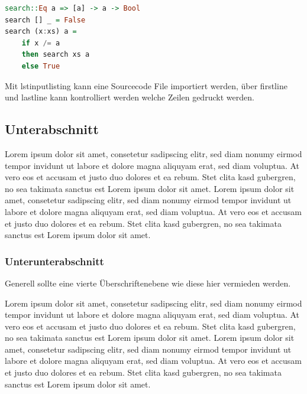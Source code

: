 \lstset{language=Haskell}
\begin{lstlisting}[language=Haskell,caption=Lineare Suche]
search::Eq a => [a] -> a -> Bool
search [] _ = False
search (x:xs) a = 
	if x /= a
	then search xs a
	else True 
\end{lstlisting}

Mit lstinputlisting kann eine Sourcecode File importiert werden, über firstline und lastline kann kontrolliert werden welche Zeilen gedruckt werden.


\subsection{Unterabschnitt}

Lorem ipsum dolor sit amet, consetetur sadipscing elitr, sed diam nonumy eirmod tempor invidunt ut labore et dolore magna aliquyam erat, sed diam voluptua. At vero eos et accusam et justo duo dolores et ea rebum. Stet clita kasd gubergren, no sea takimata sanctus est Lorem ipsum dolor sit amet. Lorem ipsum dolor sit amet, consetetur sadipscing elitr, sed diam nonumy eirmod tempor invidunt ut labore et dolore magna aliquyam erat, sed diam voluptua. At vero eos et accusam et justo duo dolores et ea rebum. Stet clita kasd gubergren, no sea takimata sanctus est Lorem ipsum dolor sit amet.

\subsubsection{Unterunterabschnitt}

Generell sollte eine vierte Überschriftenebene wie diese hier vermieden werden.

Lorem ipsum dolor sit amet, consetetur sadipscing elitr, sed diam nonumy eirmod tempor invidunt ut labore et dolore magna aliquyam erat, sed diam voluptua. At vero eos et accusam et justo duo dolores et ea rebum. Stet clita kasd gubergren, no sea takimata sanctus est Lorem ipsum dolor sit amet. Lorem ipsum dolor sit amet, consetetur sadipscing elitr, sed diam nonumy eirmod tempor invidunt ut labore et dolore magna aliquyam erat, sed diam voluptua. At vero eos et accusam et justo duo dolores et ea rebum. Stet clita kasd gubergren, no sea takimata sanctus est Lorem ipsum dolor sit amet.
